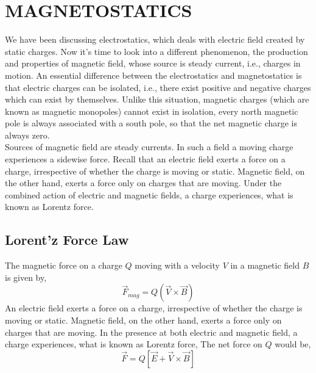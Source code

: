 \chapter{MAGNETOSTATICS}
We have been discussing electrostatics, which deals with electric field created by static charges. Now it's time to look into a different phenomenon, the production and properties of magnetic field, whose source is steady current, i.e., charges in motion. An essential difference between the electrostatics and magnetostatics is that electric charges can be isolated, i.e., there exist positive and negative charges which can exist by themselves. Unlike this situation, magnetic charges (which are known as magnetic monopoles) cannot exist in isolation, every north magnetic pole is always associated with a south pole, so that the net magnetic charge is always zero.\\
Sources of magnetic field are steady currents. In such a field a moving charge experiences a sidewise  force.  Recall that an electric field exerts a force on a charge, irrespective of whether the charge is  moving or static. Magnetic field, on the other hand, exerts a force only on charges that are moving.  Under the combined action of electric and magnetic fields, a charge experiences, what is known as Lorentz force.
\section{Lorent'z Force Law}
The magnetic force on a charge $Q$ moving with a velocity $V$ in a magnetic field $B$ is given by,
\begin{equation}\label{Lorent'z Force Law 1}
\vec{F}_{mag}=Q(\vec{V}\times \vec{B})
\end{equation}
An electric field exerts a force on a charge, irrespective of whether the charge is
moving or static. Magnetic field, on the other hand, exerts a force only on charges that are moving. In the presence at both electric and magnetic field, a charge experiences, what is known as Lorentz force,
The net force on $Q$ would be,
\begin{equation}\label{Lorent'z Force Law 2}
\vec{F}=Q[\vec{E}+\vec{V}\times \vec{B}]
\end{equation}
